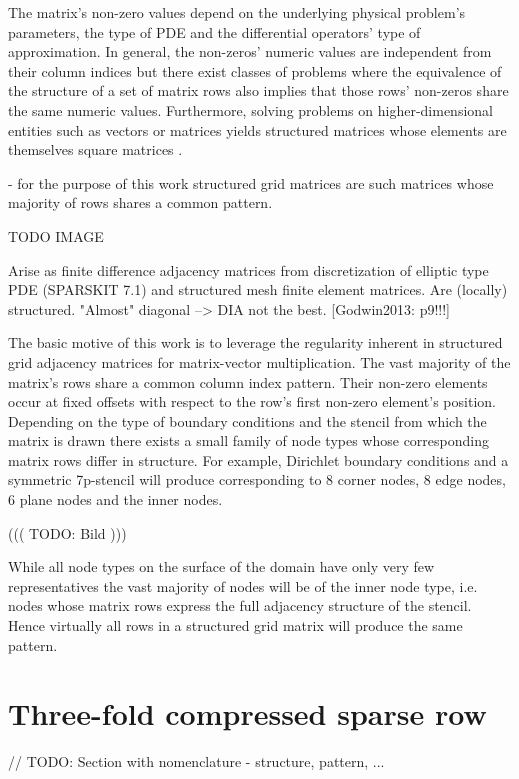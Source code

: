 \documentclass{article}
\begin{document}
    The matrix's non-zero values depend on the underlying physical problem's parameters, the type of PDE and the differential operators' type of approximation. In general, the non-zeros' numeric values are independent from their column indices but there exist classes of problems where the equivalence of the structure of a set of matrix rows also implies that those rows' non-zeros share the same numeric values. Furthermore, solving problems on higher-dimensional entities such as vectors or matrices yields structured matrices whose elements are themselves square matrices \cite{Godwin2013}.

    - for the purpose of this work structured grid matrices are such matrices whose majority of rows shares a common pattern.

    TODO IMAGE

    Arise as finite difference adjacency matrices from discretization of elliptic type PDE (SPARSKIT 7.1)
      and structured mesh finite element matrices.
    Are (locally) structured.
    "Almost" diagonal --> DIA not the best. [Godwin2013: p9!!!]

    The basic motive of this work is to leverage the regularity inherent in structured grid adjacency matrices for matrix-vector multiplication. The vast majority of the matrix's rows share a common column index pattern. Their non-zero elements occur at fixed offsets with respect to the row's first non-zero element's position. Depending on the type of boundary conditions and the stencil from which the matrix is drawn there exists a small family of node types whose corresponding matrix rows differ in structure. For example, Dirichlet boundary conditions and a symmetric 7p-stencil will produce corresponding to 8 corner nodes, 8 edge nodes, 6 plane nodes and the inner nodes.

    ((( TODO: Bild )))

    While all node types on the surface of the domain have only very few representatives the vast majority of nodes will be of the inner node type, i.e. nodes whose matrix rows express the full adjacency structure of the stencil. Hence virtually all rows in a structured grid matrix will produce the same pattern.

\section{Three-fold compressed sparse row}

// TODO: Section with nomenclature
  - structure, pattern, ...
\end{document}
